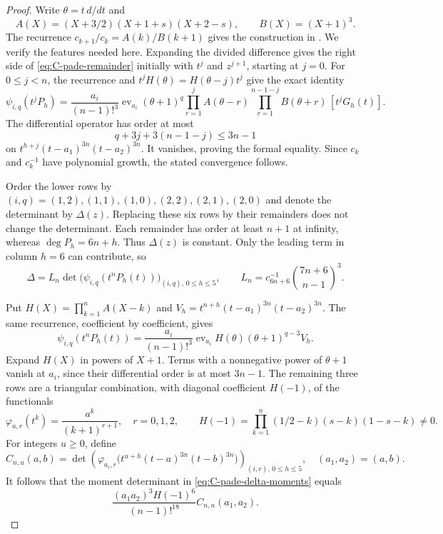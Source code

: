\begin{proof}
Write $\theta=t\,d/dt$ and
\[
 A(X)=(X+3/2)(X+1+s)(X+2-s),\qquad B(X)=(X+1)^3.
\]
The recurrence $c_{k+1}/c_k=A(k)/B(k+1)$ gives the construction in
\cite[Proposition~3.6]{DHK2022}.  We verify the features needed here.
Expanding the divided difference gives the right side of
\eqref{eq:C-pade-remainder} initially with $t^{j}$ and $z^{j+1}$,
starting at $j=0$.  For $0\le j<n$, the recurrence and
$t^jH(\theta)=H(\theta-j)t^j$ give the exact identity
\[
 \psi_{i,q}(t^jP_h)=\frac{a_i}{(n-1)!^3}
 \operatorname{ev}_{a_i}(\theta+1)^q
 \prod_{r=1}^{j}A(\theta-r)
 \prod_{r=1}^{n-1-j}B(\theta+r)\,[t^jG_h(t)].
\]
The differential operator has order at most
\[
 q+3j+3(n-1-j)\le3n-1
\]
on $t^{h+j}(t-a_1)^{3n}(t-a_2)^{3n}$.  It vanishes, proving the
formal equality.  Since $c_k$ and $c_k^{-1}$ have polynomial growth,
the stated convergence follows.

Order the lower rows by $(i,q)=(1,2),(1,1),(1,0),(2,2),(2,1),(2,0)$
and denote the determinant by $\Delta(z)$.  Replacing these six rows
by their remainders does not change the determinant.  Each remainder
has order at least $n+1$ at infinity, whereas $\deg P_h=6n+h$.
Thus $\Delta(z)$ is constant.  Only the leading term in column
$h=6$ can contribute, so
\begin{equation}\label{eq:C-pade-delta-moments}
 \Delta=L_n\det\bigl(\psi_{i,q}(t^nP_h(t))\bigr)_{
                    (i,q),\,0\le h\le5},\qquad
 L_n=c_{6n+6}^{-1}\binom{7n+6}{n-1}^{\!3}.
\end{equation}

Put $H(X)=\prod_{k=1}^{n}A(X-k)$ and
$V_h=t^{n+h}(t-a_1)^{3n}(t-a_2)^{3n}$.  The same recurrence,
coefficient by coefficient, gives
\[
 \psi_{i,q}(t^nP_h(t))
  =\frac{a_i}{(n-1)!^3}
    \operatorname{ev}_{a_i}H(\theta)(\theta+1)^{q-3}V_h.
\]
Expand $H(X)$ in powers of $X+1$.  Terms with a nonnegative
power of $\theta+1$ vanish at $a_i$, since their differential
order is at most $3n-1$.  The remaining three rows are a triangular
combination, with diagonal coefficient $H(-1)$, of the functionals
\[
 \varphi_{a,r}(t^k)=\frac{a^k}{(k+1)^{r+1}},\quad r=0,1,2,
 \qquad
 H(-1)=\prod_{k=1}^n(1/2-k)(s-k)(1-s-k)\ne0.
\]
For integers $u\ge0$, define
\[
 C_{n,u}(a,b)=\det\left(
  \varphi_{a_i,r}\bigl(t^{u+h}(t-a)^{3n}(t-b)^{3n}\bigr)
                         \right)_{(i,r),\,0\le h\le5},
 \quad (a_1,a_2)=(a,b).
\]
It follows that the moment determinant in
\eqref{eq:C-pade-delta-moments} equals
\begin{equation}\label{eq:C-pade-moment-reduction}
 \frac{(a_1a_2)^3H(-1)^6}{(n-1)!^{18}}C_{n,n}(a_1,a_2).
\end{equation}


\end{proof}
